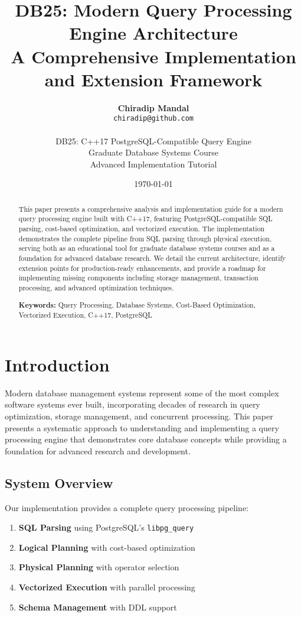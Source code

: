 \documentclass[12pt,a4paper]{article}
\title{\textbf{DB25: Modern Query Processing Engine Architecture \\
A Comprehensive Implementation and Extension Framework}}
\author{
    \textbf{Chiradip Mandal} \\
    \texttt{chiradip@github.com} \\
    \\
    DB25: C++17 PostgreSQL-Compatible Query Engine \\
    Graduate Database Systems Course \\
    Advanced Implementation Tutorial
}
\date{\today}
\begin{document}
\maketitle

\begin{abstract}
This paper presents a comprehensive analysis and implementation guide for a modern query processing engine built with C++17, featuring PostgreSQL-compatible SQL parsing, cost-based optimization, and vectorized execution. The implementation demonstrates the complete pipeline from SQL parsing through physical execution, serving both as an educational tool for graduate database systems courses and as a foundation for advanced database research. We detail the current architecture, identify extension points for production-ready enhancements, and provide a roadmap for implementing missing components including storage management, transaction processing, and advanced optimization techniques.

\textbf{Keywords:} Query Processing, Database Systems, Cost-Based Optimization, Vectorized Execution, C++17, PostgreSQL
\end{abstract}

\tableofcontents
\newpage

\section{Introduction}

Modern database management systems represent some of the most complex software systems ever built, incorporating decades of research in query optimization, storage management, and concurrent processing. This paper presents a systematic approach to understanding and implementing a query processing engine that demonstrates core database concepts while providing a foundation for advanced research and development.

\subsection{System Overview}

Our implementation provides a complete query processing pipeline:

\begin{enumerate}
    \item \textbf{SQL Parsing} using PostgreSQL's \texttt{libpg\_query}
    \item \textbf{Logical Planning} with cost-based optimization
    \item \textbf{Physical Planning} with operator selection
    \item \textbf{Vectorized Execution} with parallel processing
    \item \textbf{Schema Management} with DDL support
\end{enumerate}
\end{document}
